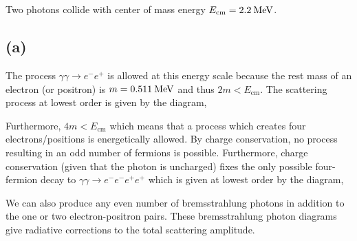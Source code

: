 \documentclass[12pt]{article}
\begin{document}
\section{}
\newcommand{\Ecm}{E_{\mathrm{cm}}}

Two photons collide with center of mass energy $E_{\mathrm{cm}} = 2.2 \: \mathrm{MeV}$.

\subsection{(a)}

The process $\gamma \gamma \to e^{-} e^{+}$ is allowed at this energy scale because the rest mass of an electron (or positron) is $m = 0.511 \: \mathrm{MeV}$ and thus $2 m < \Ecm$. The scattering process at lowest order is given by the diagram,
\begin{center}
\end{center}
Furthermore, $4 m < \Ecm$ which means that a process which creates four electrons/positions is energetically allowed. By charge conservation, no process resulting in an odd number of fermions is possible. Furthermore, charge conservation (given that the photon is uncharged) fixes the only possible four-fermion decay to $\gamma \gamma \to e^{-} e^{-} e^{+} e^{+}$ which is given at lowest order by the diagram,
\begin{center}
\end{center}
We can also produce any even number of bremsstrahlung photons in addition to the one or two electron-positron pairs. These bremsstrahlung photon diagrams give radiative corrections to the total scattering amplitude. 
\end{document}
